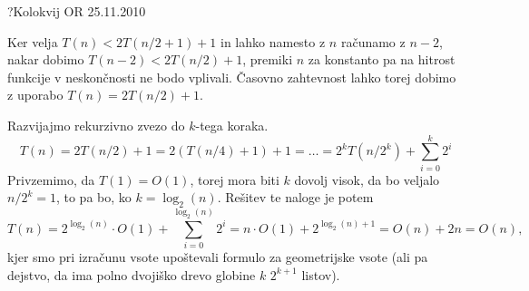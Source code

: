\begin{naloga}{?}{Kolokvij OR 25.11.2010}
\begin{odgovor}
\begin{enumerate}[(a)]
Ker velja $T(n) < 2T(n/2 + 1) + 1$ in lahko namesto z $n$ računamo z $n - 2$, 
nakar dobimo $T(n - 2) < 2T(n/2) + 1$, 
premiki $n$ za konstanto pa na hitrost funkcije v neskončnosti ne bodo vplivali.
Časovno zahtevnost lahko torej dobimo z uporabo $T(n) = 2T(n/2) + 1$.

Razvijajmo rekurzivno zvezo do $k$-tega koraka.
$$T(n) = 2T(n/2) + 1 = 2 (T(n/4) + 1) + 1 = \dots = 2^k T\left(n / 2^k\right) + \sum_{i=0}^{k} 2^i$$
Privzemimo, da $T(1) = O(1)$, torej mora biti $k$ dovolj visok, da bo veljalo
$n / 2^k = 1$, to pa bo, ko $k = \log_2(n)$.
Rešitev te naloge je potem
$$T(n) = 2^{\log_2(n)} \cdot O(1) + \sum_{i=0}^{\log_2(n)} 2^i = n \cdot O(1) + 2^{\log_2(n) + 1} = O(n) + 2n = O(n),$$
kjer smo pri izračunu vsote upoštevali formulo za geometrijske vsote 
(ali pa dejstvo, da ima polno dvojiško drevo globine $k$ $2^{k+1}$ listov).

\end{enumerate}
\end{odgovor}
\end{naloga}
